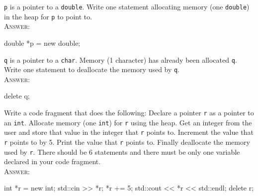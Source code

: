 

\renewcommand\AUTHOR{cadalebout1@cougars.ccis.edu} %


\topmattertwo


\nextq
\verb!p! is a pointer to a \verb!double!.
Write one statement allocating memory (one \verb!double!) in the heap
for \verb!p! to point to.
\\ \textsc{Answer:}\vspace{-2mm}
\begin{answercode}
double *p = new double;
\end{answercode}


\nextq
\verb!q! is a pointer to a \verb!char!.
Memory (1 character) has already been allocated \verb!q!.
Write one statement to deallocate the memory used by \verb!q!.
\\ \textsc{Answer:}\vspace{-2mm}
\begin{answercode}
delete q;
\end{answercode}

\nextq
Write a code fragment that does the following:
Declare a pointer \verb!r! as a pointer to an \verb!int!.
Allocate memory (one \verb!int!) for \verb!r! using the heap.
Get an integer from the user and store that value in the integer
that \verb!r! points to.
Increment the value that \verb!r! points to by 5.
Print the value that \verb!r! points to.
Finally deallocate the memory used by \verb!r!.
There should be 6 statements and
there must be only one variable declared in your code fragment.
\\ \textsc{Answer:}\vspace{-2mm}
\begin{answercode}
int *r = new int;
std::cin >> *r;
*r += 5;
std::cout << *r << std::endl;
delete r;
\end{answercode}


\newpage


